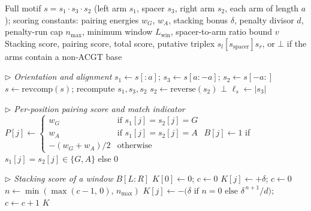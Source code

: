 \begin{algorithm}
\caption{HSeeker Phase 3: Thermodynamic Stability Scoring}
\label{alg:mirror-phase3}
\scriptsize
\begin{algorithmic}[1]
\Require Full motif $s = s_1 \cdot s_3 \cdot s_2$ (left arm $s_1$, spacer $s_3$,
         right arm $s_2$, each arm of length $a$);
         scoring constants: pairing energies $w_G$, $w_A$, stacking bonus $\delta$,
         penalty divisor $d$, penalty-run cap $n_{\max}$,
         minimum window $L_{\mathrm{win}}$, spacer-to-arm ratio bound $v$
\Ensure Stacking score, pairing score, total score, putative triplex
        $s_l[s_{\mathrm{spacer}}]s_r$, or $\bot$ if the arms contain a non-ACGT base

\Statex \textit{$\triangleright$ Orientation and alignment}
\State $s_1 \leftarrow s[{:}a]$;\; $s_3 \leftarrow s[a{:}-a]$;\; $s_2 \leftarrow s[-a{:}]$
    \State $s \leftarrow \mathrm{revcomp}(s)$; recompute $s_1, s_3, s_2$
\EndIf
\State $s_2 \leftarrow \mathrm{reverse}(s_2)$
 \State \Return $\bot$ \EndIf
\State $\ell_s \leftarrow |s_3|$

\Statex \textit{$\triangleright$ Per-position pairing score and match indicator}
    \State $P[j] \leftarrow
        \begin{cases}
            w_G   & \text{if } s_1[j] = s_2[j] = G\\
            w_A   & \text{if } s_1[j] = s_2[j] = A\\
            -(w_G + w_A)/2 & \text{otherwise}
        \end{cases}$
    \State $B[j] \leftarrow 1$ if $s_1[j] = s_2[j] \in \{G,A\}$ else $0$
\EndFor

\Statex \textit{$\triangleright$ Stacking score of a window $B[L{:}R]$}
    \State $K[0] \leftarrow 0$;\; $c \leftarrow 0$
            \State $K[j] \leftarrow +\delta$;\; $c \leftarrow 0$
        \Else
            \State $n \leftarrow \min(\max(c - 1,\, 0),\, n_{\max})$
            \State $K[j] \leftarrow -\bigl(\delta \text{ if } n = 0 \text{ else }
                   \delta^{\,n+1}/d\bigr)$;\; $c \leftarrow c + 1$
        \EndIf
    \EndFor
    \State \Return $K$
\EndProcedure


\end{algorithmic}
\end{algorithm}
